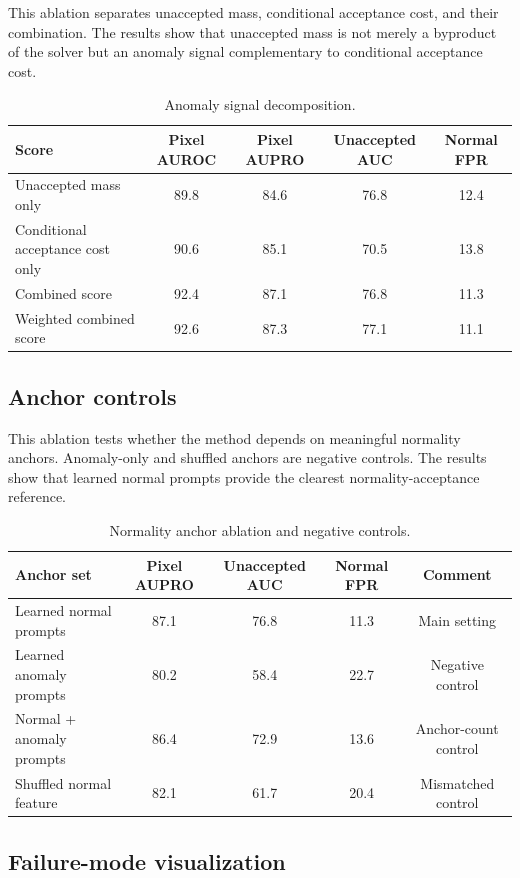 \documentclass[10pt]{article}
\begin{document}
This ablation separates unaccepted mass, conditional acceptance cost, and their combination.
The results show that unaccepted mass is not merely a byproduct of the solver but an anomaly signal complementary to conditional acceptance cost.

\begin{table}[t]
\centering
\caption{Anomaly signal decomposition.}
\label{tab:score}
\begin{tabular}{lcccc}
\toprule
Score & Pixel AUROC & Pixel AUPRO & Unaccepted AUC & Normal FPR \\
\midrule
Unaccepted mass only & 89.8 & 84.6 & 76.8 & 12.4 \\
Conditional acceptance cost only & 90.6 & 85.1 & 70.5 & 13.8 \\
Combined score & 92.4 & 87.1 & 76.8 & 11.3 \\
Weighted combined score & 92.6 & 87.3 & 77.1 & 11.1 \\
\bottomrule
\end{tabular}
\end{table}

\subsection{Anchor controls}

This ablation tests whether the method depends on meaningful normality anchors.
Anomaly-only and shuffled anchors are negative controls.
The results show that learned normal prompts provide the clearest normality-acceptance reference.

\begin{table}[t]
\centering
\caption{Normality anchor ablation and negative controls.}
\label{tab:anchors}
\begin{tabular}{lcccc}
\toprule
Anchor set & Pixel AUPRO & Unaccepted AUC & Normal FPR & Comment \\
\midrule
Learned normal prompts & 87.1 & 76.8 & 11.3 & Main setting \\
Learned anomaly prompts & 80.2 & 58.4 & 22.7 & Negative control \\
Normal + anomaly prompts & 86.4 & 72.9 & 13.6 & Anchor-count control \\
Shuffled normal feature & 82.1 & 61.7 & 20.4 & Mismatched control \\
\bottomrule
\end{tabular}
\end{table}

\subsection{Failure-mode visualization}
\end{document}
